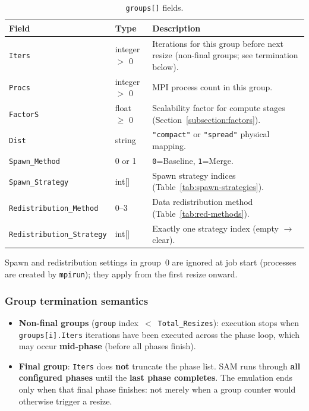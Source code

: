 \begin{table}[H]
\centering
\small
\begin{tabular}{@{}llp{7cm}@{}}
\toprule
\textbf{Field} & \textbf{Type} & \textbf{Description} \\
\midrule
\texttt{Iters} & integer $>$ 0 & Iterations for this group before next resize (non-final groups; see termination below). \\
\texttt{Procs} & integer $>$ 0 & MPI process count in this group. \\
\texttt{FactorS} & float $\geq$ 0 & Scalability factor for compute stages (Section~\ref{subsection:factors}). \\
\texttt{Dist} & string & \texttt{"compact"} or \texttt{"spread"} physical mapping. \\
\texttt{Spawn\_Method} & 0 or 1 & \texttt{0}=Baseline, \texttt{1}=Merge. \\
\texttt{Spawn\_Strategy} & int[] & Spawn strategy indices (Table~\ref{tab:spawn-strategies}). \\
\texttt{Redistribution\_Method} & 0--3 & Data redistribution method (Table~\ref{tab:red-methods}). \\
\texttt{Redistribution\_Strategy} & int[] & Exactly one strategy index (empty $\rightarrow$ clear). \\
\bottomrule
\end{tabular}
\caption{\texttt{groups[]} fields.}
\label{tab:group-fields}
\end{table}

Spawn and redistribution settings in group~0 are ignored at job start (processes are created by \texttt{mpirun}); they apply from the first resize onward.

\subsubsection{Group termination semantics}
\label{subsection:group-termination}

\begin{itemize}
  \item \textbf{Non-final groups} (\texttt{group} index~$<$~\texttt{Total\_Resizes}): execution stops when \texttt{groups[i].Iters} iterations have been executed across the phase loop, which may occur \textbf{mid-phase} (before all phases finish).
  \item \textbf{Final group}: \texttt{Iters} does \textbf{not} truncate the phase list. SAM runs through \textbf{all configured phases} until the \textbf{last phase completes}. The emulation ends only when that final phase finishes: not merely when a group counter would otherwise trigger a resize.
\end{itemize}


